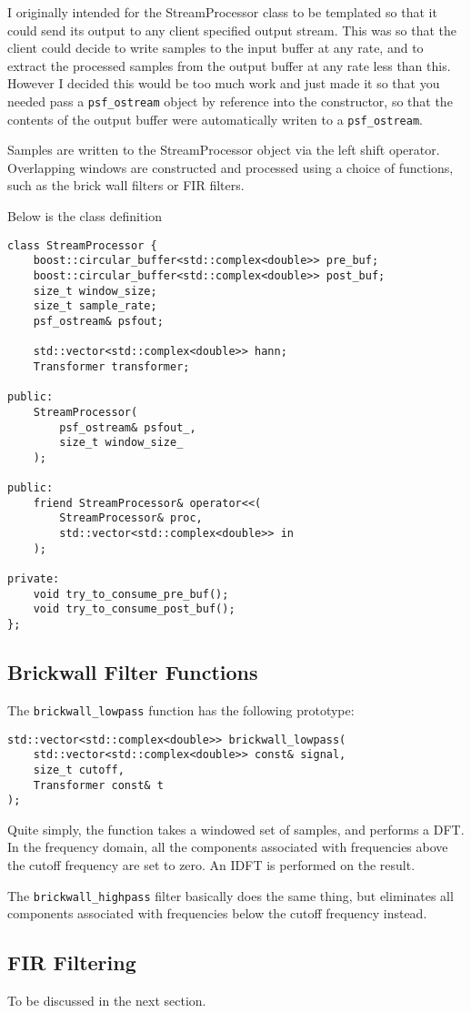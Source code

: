 I originally intended for the StreamProcessor class to be templated so that 
it could send its output to any client specified output stream.
This was so that the client could decide to write samples to the input buffer
at any rate, and to extract the processed samples from the output buffer
at any rate less than this.
However I decided this would be too much work and just made it so that you 
needed pass a \verb|psf_ostream| object by reference into the constructor, so that
the contents of the output buffer were automatically writen to a \verb|psf_ostream|.

Samples are written to the StreamProcessor object via the left shift operator.
Overlapping windows are constructed and processed using a choice of functions,
such as the brick wall filters or FIR filters.

Below is the class definition
\begin{verbatim}
class StreamProcessor {
    boost::circular_buffer<std::complex<double>> pre_buf;
    boost::circular_buffer<std::complex<double>> post_buf;
    size_t window_size;
    size_t sample_rate;
    psf_ostream& psfout;

    std::vector<std::complex<double>> hann;
    Transformer transformer;

public:
    StreamProcessor(   
        psf_ostream& psfout_, 
        size_t window_size_
    );

public:
    friend StreamProcessor& operator<<(
        StreamProcessor& proc, 
        std::vector<std::complex<double>> in
    );

private:
    void try_to_consume_pre_buf();
    void try_to_consume_post_buf();
};
\end{verbatim}

\pagebreak

\subsection{Brickwall Filter Functions}
The \verb|brickwall_lowpass| function has the following prototype:

\begin{verbatim}
std::vector<std::complex<double>> brickwall_lowpass(
    std::vector<std::complex<double>> const& signal,
    size_t cutoff,
    Transformer const& t
);
\end{verbatim}

Quite simply, the function takes a windowed set of samples, and performs a DFT.
In the frequency domain, all the components associated with frequencies above 
the cutoff frequency are set to zero.
An IDFT is performed on the result.

The \verb|brickwall_highpass| filter basically does the same thing, 
but eliminates all components associated with frequencies below the cutoff frequency instead.


\subsection{FIR Filtering}
To be discussed in the next section.